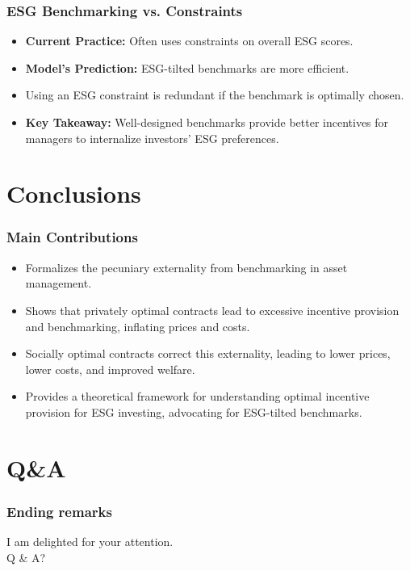 \documentclass{beamer} %
\begin{document}
	\begin{frame}
		\frametitle{ESG Benchmarking vs. Constraints}
		\begin{itemize}
			\item \textbf{Current Practice:} Often uses constraints on overall ESG scores.
			\item \textbf{Model's Prediction:} ESG-tilted benchmarks are more efficient.
			\item Using an ESG constraint is redundant if the benchmark is optimally chosen.
			\item \textbf{Key Takeaway:} Well-designed benchmarks provide better incentives for managers to internalize investors' ESG preferences.
		\end{itemize}
	\end{frame}
	
	\section{Conclusions}
	\begin{frame}
		\frametitle{Main Contributions}
		\begin{itemize}
			\item Formalizes the pecuniary externality from benchmarking in asset management.
			\item Shows that privately optimal contracts lead to excessive incentive provision and benchmarking, inflating prices and costs.
			\item Socially optimal contracts correct this externality, leading to lower prices, lower costs, and improved welfare.
			\item Provides a theoretical framework for understanding optimal incentive provision for ESG investing, advocating for ESG-tilted benchmarks.
		\end{itemize}
	\end{frame}
	
	
	\section{Q\&A}
	\begin{frame}[fragile]
		\frametitle{Ending remarks}
		\begin{center}
			I am delighted for your attention.\\
			\vspace{1em}
			Q \& A?
		\end{center}
	\end{frame}
	
\end{document}
